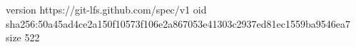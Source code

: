 version https://git-lfs.github.com/spec/v1
oid sha256:50a45ad4ce2a150f10573f106e2a867053e41303c2937ed81ec1559ba9546ea7
size 522
